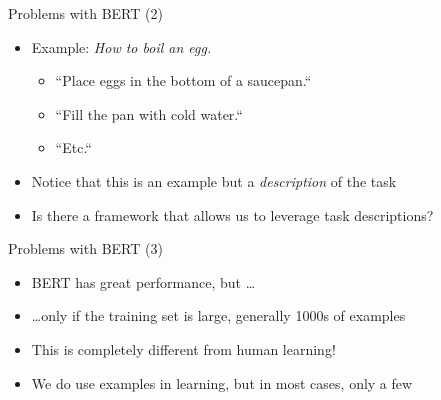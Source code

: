 \begin{frame}{Problems with BERT (2)}

\vfill
			
\begin{itemize}
\item Example: \textit{How to boil an egg.}
		\begin{itemize}
			\item ``Place eggs in the bottom of a saucepan.``
			\item ``Fill the pan with cold water.``
			\item ``Etc.``
		\end{itemize}
\item Notice that this is  an example but a \textit{description} of the task
\item \ques Is there a framework that allows us to leverage task descriptions?
\end{itemize}

\vfill

\end{frame}


\begin{frame}{Problems with BERT (3)}

\vfill

  \begin{itemize}
\item BERT has great performance, but \ldots
\item \ldots only if the training set is large, generally 1000s of examples
\item This is completely different from human learning!
\item We do use examples in learning, but in most cases, only a few
\end{itemize}

\vfill

\end{frame}


